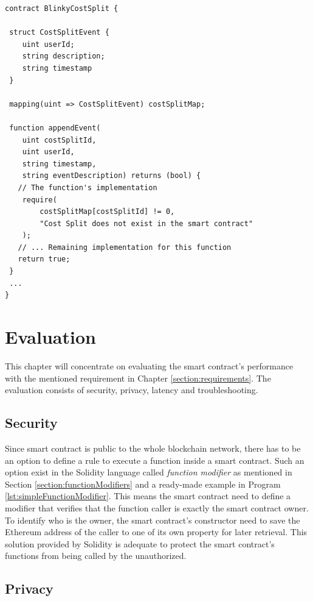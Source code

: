 \documentclass[twoside,draftfooter]{tutthesis} %
\begin{document}
\begin{lstlisting}[float,caption={Using \texttt{require} function to validate input data},label={lst:assertValidateInput},language=Solidity]
contract BlinkyCostSplit {
 
 struct CostSplitEvent {
    uint userId;
    string description;
    string timestamp
 }
 
 mapping(uint => CostSplitEvent) costSplitMap;
 
 function appendEvent(
    uint costSplitId,
    uint userId,
    string timestamp,
    string eventDescription) returns (bool) {
   // The function's implementation
    require(
        costSplitMap[costSplitId] != 0,
        "Cost Split does not exist in the smart contract"
    );
   // ... Remaining implementation for this function
   return true;
 }
 ...
}
\end{lstlisting}

\chapter{Evaluation}
\label{ch:evaluation}

This chapter will concentrate on evaluating the smart contract's performance with the mentioned requirement in Chapter \ref{section:requirements}. The evaluation consists of security, privacy, latency and troubleshooting.

\section{Security}
\label{section:security}

Since smart contract is public to the whole blockchain network, there has to be an option to define a rule to execute a function inside a smart contract. Such an option exist in the Solidity language called \textit{function modifier} as mentioned in Section \ref{section:functionModifiers} and a ready-made example in Program \ref{lst:simpleFunctionModifier}. This means the smart contract need to define a modifier that verifies that the function caller is exactly the smart contract owner. To identify who is the owner, the smart contract's constructor need to save the Ethereum address of the caller to one of its own property for later retrieval. This solution provided by Solidity is adequate to protect the smart contract's functions from being called by the unauthorized.

\section{Privacy}
\end{document}
